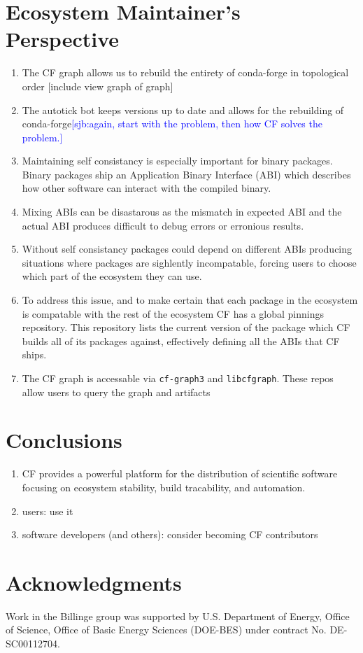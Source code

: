 \documentclass[fleqn,10pt,lineno]{wlpeerj} %
\newcommand{\sjb}[1]{\textcolor{blue}{[sjb:#1]}}
\newcounter{saveenumi}
\newcommand{\seti}{\setcounter{saveenumi}{\value{enumi}}}
\newcommand{\conti}{\setcounter{enumi}{\value{saveenumi}}}
\begin{document}
\section*{Ecosystem Maintainer's Perspective}
\begin{enumerate}\conti
\item The CF graph allows us to rebuild the entirety of conda-forge in
topological order [include view graph of graph]
\item The autotick bot keeps versions up to date and allows for the
rebuilding of conda-forge\sjb{again, start with the problem, then how CF solves the problem.}
\item Maintaining self consistancy is especially important for binary packages.
Binary packages ship an Application Binary Interface (ABI) which describes how other software
can interact with the compiled binary.
\item Mixing ABIs can be disastarous as the mismatch in expected ABI and 
the actual ABI produces difficult to debug errors or erronious results.
\item Without self consistancy packages could depend on different ABIs
producing situations where packages are sighlently incompatable, forcing
users to choose which part of the ecosystem they can use.
\item To address this issue, and to make certain that each package in the 
ecosystem is compatable with the rest of the ecosystem CF has a global 
pinnings repository.
This repository lists the current version of the package which CF builds
all of its packages against, effectively defining all the ABIs that CF ships.
\item The CF graph is accessable via \texttt{cf-graph3} and \texttt{libcfgraph}.
These repos allow users to query the graph and artifacts
\end{enumerate}\seti


\section*{Conclusions}
\begin{enumerate}\conti
\item CF provides a powerful platform for the distribution of scientific
software focusing on ecosystem stability, build tracability, and automation.
\item users: use it
\item software developers (and others): consider becoming CF contributors
\end{enumerate}\seti


\section*{Acknowledgments}

Work in the Billinge group was supported by U.S. Department of Energy,
Office of Science, Office of Basic Energy Sciences (DOE-BES) under contract
No. DE-SC00112704.


\end{document}
